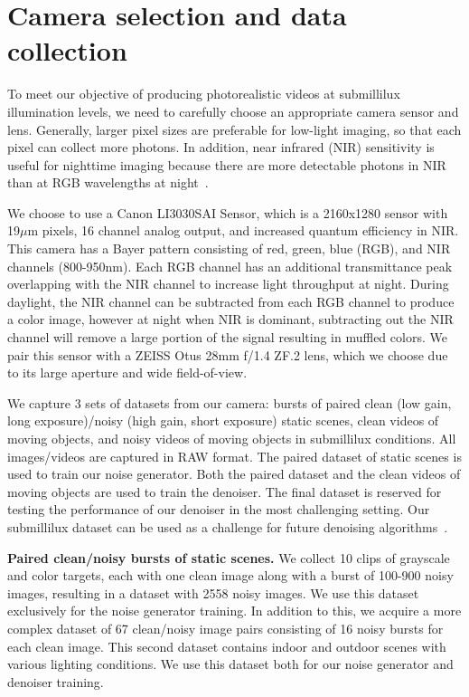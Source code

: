 \documentclass[final]{cvpr}
\begin{document}
\section{Camera selection and data collection}
\label{sec:camera}
To meet our objective of producing photorealistic videos at submillilux illumination levels, we need to carefully choose an appropriate camera sensor and lens. Generally, larger pixel sizes are preferable for low-light imaging, so that each pixel can collect more photons. In addition, near infrared (NIR) sensitivity is useful for nighttime imaging because there are more detectable photons in NIR than at RGB wavelengths at night~\cite{leinert19981997, vollmerhausen2003night}.

We choose to use a Canon LI3030SAI Sensor, which is a 2160x1280 sensor with 19$\mu$m pixels, 16 channel analog output, and increased quantum efficiency in NIR. This camera has a Bayer pattern consisting of red, green, blue (RGB), and NIR channels (800-950nm). Each RGB channel has an additional transmittance peak overlapping with the NIR channel to increase light throughput at night. During daylight, the NIR channel can be subtracted from each RGB channel to produce a color image, however at night when NIR is dominant, subtracting out the NIR channel will remove a large portion of the signal resulting in muffled colors. We pair this sensor with a ZEISS Otus 28mm f/1.4 ZF.2 lens, which we choose due to its large aperture and wide field-of-view. 

We capture 3 sets of datasets from our camera: bursts of paired clean (low gain, long exposure)/noisy (high gain, short exposure) static scenes, clean videos of moving objects, and noisy videos of moving objects in submillilux conditions. All images/videos are captured in RAW format. The paired dataset of static scenes is used to train our noise generator. Both the paired dataset and the clean videos of moving objects are used to train the denoiser. The final dataset is reserved for testing the performance of our denoiser in the most challenging setting. Our submillilux dataset can be used as a challenge for future denoising algorithms~\cite{starlightdataset}. 


\vspace{1mm}\noindent\textbf{Paired clean/noisy bursts of static scenes.}
We collect 10 clips of grayscale and color targets, each with one clean image along with a burst of 100-900 noisy images, resulting in a dataset with 2558 noisy images.  We use this dataset exclusively for the noise generator training. In addition to this, we acquire a more complex dataset of 67 clean/noisy image pairs consisting of 16 noisy bursts for each clean image. This second dataset contains indoor and outdoor scenes with various lighting conditions. We use this dataset both for our noise generator and denoiser training. 
\end{document}
